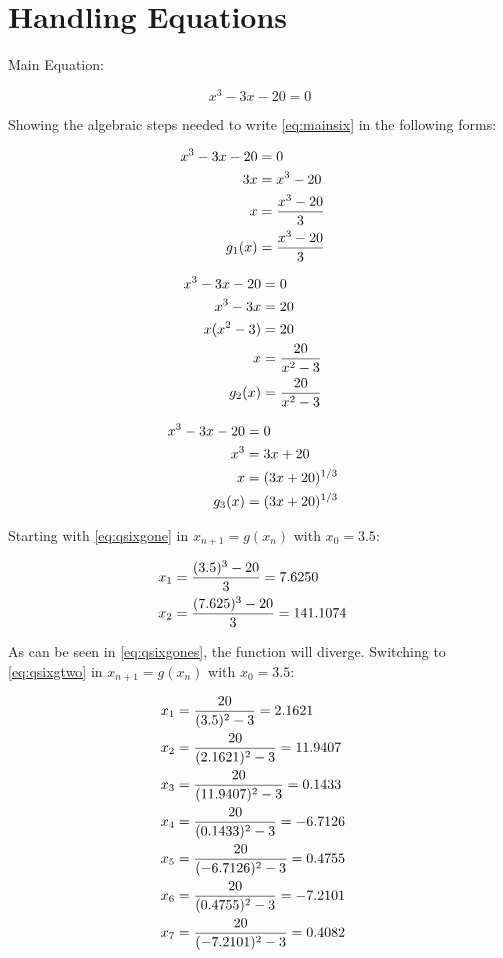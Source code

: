 \section{Handling Equations}
	
	Main Equation:

	\begin{equation}
		x^3 - 3x - 20 = 0
	\label{eq:mainsix}
	\end{equation}

	Showing the algebraic steps needed to write \cref{eq:mainsix} in the following forms:

	\begin{align}
		x^3 - 3x - 20 &= 0& \notag \\
		3x &= x^3 - 20& \notag \\
		x &= \frac{x^3 - 20}{3}& \notag \\
		g_{1}(x) &= \frac{x^3 - 20}{3}&
		\label{eq:qsixgone}
	\end{align}

	\begin{align}
		x^3 - 3x - 20 &= 0& \notag \\
		x^3 - 3x &= 20& \notag \\
		x(x^2 -3) &= 20& \notag \\
		x &= \frac{20}{x^2 -3}& \notag \\
		g_{2}(x) &= \frac{20}{x^2 -3}&
		\label{eq:qsixgtwo}
	\end{align}

	\begin{align}
		x^3 - 3x - 20 &= 0& \notag \\
		x^3 &= 3x + 20& \notag \\
		x &= (3x + 20)^{1/3}& \notag \\
		g_{3}(x) &= (3x + 20)^{1/3}&
		\label{eq:qsixgthree}
	\end{align}

	Starting with \cref{eq:qsixgone} in $x_{n+1} = g(x_{n})$ with $x_{0} = 3.5$:

	\begin{align}
		x_{1} &= \frac{(3.5)^3 - 20}{3} = 7.6250& \notag \\
		x_{2} &= \frac{(7.625)^3 - 20}{3} = 141.1074&
		\label{eq:qsixgones}
	\end{align}

	As can be seen in \cref{eq:qsixgones}, the function will diverge. Switching to \cref{eq:qsixgtwo} in $x_{n+1} = g(x_{n})$ with $x_{0} = 3.5$:

	\begin{align}
		x_{1} &= \frac{20}{(3.5)^2 - 3} = 2.1621& \notag \\
		x_{2} &= \frac{20}{(2.1621)^2 - 3} = 11.9407& \notag \\
		x_{3} &= \frac{20}{(11.9407)^2 - 3} = 0.1433& \notag \\
		x_{4} &= \frac{20}{(0.1433)^2 - 3} = -6.7126& \notag \\
		x_{5} &= \frac{20}{(-6.7126)^2 - 3} = 0.4755& \notag \\
		x_{6} &= \frac{20}{(0.4755)^2 - 3} = -7.2101& \notag \\
		x_{7} &= \frac{20}{(-7.2101)^2 - 3} = 0.4082&
		\label{eq:qsixgtwos}
	\end{align}

